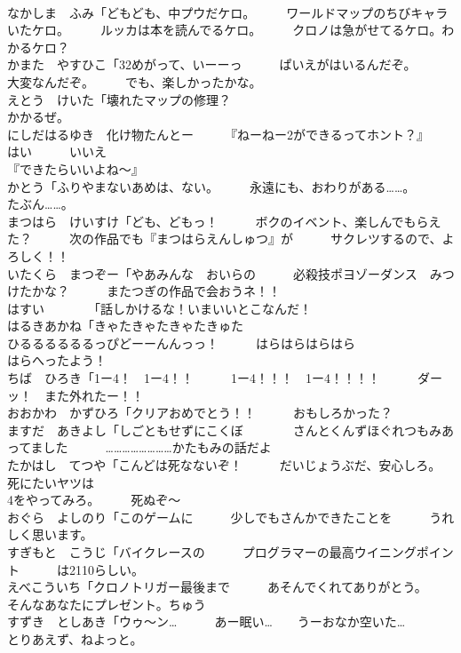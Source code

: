 \documentclass[8pt]{extreport}
\begin{document}
\begin{CJK}{UTF8}{min}
\\	なかしま　ふみ「どもども、中プウだケロ。　　　ワールドマップのちびキャラいたケロ。　　　ルッカは本を読んでるケロ。　　　クロノは急がせてるケロ。わかるケロ？	
\\	かまた　やすひこ「32めがって、いーーっ　　　ぱいえがはいるんだぞ。　　　大変なんだぞ。　　　でも、楽しかったかな。	
\\	えとう　けいた「壊れたマップの修理？　　　
\\	かかるぜ。	
\\	にしだはるゆき　化け物たんとー　　　『ねーねー2ができるってホント？』　　　はい　　　いいえ	
\\	『できたらいいよね～』	
\\	かとう「ふりやまないあめは、ない。　　　永遠にも、おわりがある……。	
\\	たぶん……。	
\\	まつはら　けいすけ「ども、どもっ！　　　ボクのイベント、楽しんでもらえた？　　　次の作品でも『まつはらえんしゅつ』が　　　サクレツするので、よろしく！！	
\\	いたくら　まつぞー「やあみんな　おいらの　　　必殺技ポヨゾーダンス　みつけたかな？　　　またつぎの作品で会おうネ！！	
\\	はすい　　　　「話しかけるな！いまいいとこなんだ！	
\\	はるきあかね「きゃたきゃたきゃたきゅた
\\	ひるるるるるるっぴどーーんんっっ！　　　はらはらはらはら
\\	はらへったよう！	
\\	ちば　ひろき「1ー4！　1ー4！！　　　1ー4！！！　1ー4！！！！　　　ダーッ！　また外れたー！！	
\\	おおかわ　かずひろ「クリアおめでとう！！　　　おもしろかった？	
\\	ますだ　あきよし「しごともせずにこくぼ　　　　さんとくんずほぐれつもみあってました　　　……………………かたもみの話だよ	
\\	たかはし　てつや「こんどは死なないぞ！　　　だいじょうぶだ、安心しろ。　　　死にたいヤツは
\\	4をやってみろ。　　　死ぬぞ～	
\\	おぐら　よしのり「このゲームに　　　少しでもさんかできたことを　　　うれしく思います。	
\\	すぎもと　こうじ「バイクレースの　　　プログラマーの最高ウイニングポイント　　　は2110らしい。	
\\	えべこういち「クロノトリガー最後まで　　　あそんでくれてありがとう。　　　そんなあなたにプレゼント。ちゅう
\\	すずき　としあき「ウゥ～ン…　　　あー眠い…　　うーおなか空いた…　　　とりあえず、ねよっと。	

\end{CJK}
\end{document}
